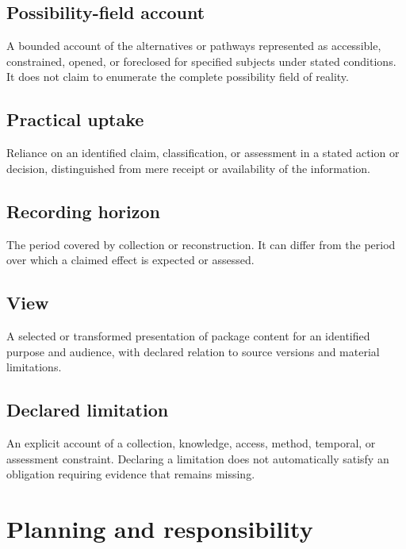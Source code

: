\documentclass[11pt,a4paper]{article}
\begin{document}
\subsection{Possibility-field account}
A bounded account of the alternatives or pathways represented as accessible, constrained, opened, or foreclosed for specified subjects under stated conditions. It does not claim to enumerate the complete possibility field of reality.

\subsection{Practical uptake}
Reliance on an identified claim, classification, or assessment in a stated action or decision, distinguished from mere receipt or availability of the information.

\subsection{Recording horizon}
The period covered by collection or reconstruction. It can differ from the period over which a claimed effect is expected or assessed.

\subsection{View}
A selected or transformed presentation of package content for an identified purpose and audience, with declared relation to source versions and material limitations.

\subsection{Declared limitation}
An explicit account of a collection, knowledge, access, method, temporal, or assessment constraint. Declaring a limitation does not automatically satisfy an obligation requiring evidence that remains missing.

\section{Planning and responsibility}
\end{document}
